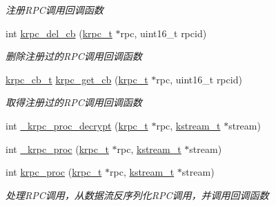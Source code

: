 \begin{DoxyCompactItemize}
\begin{DoxyCompactList}\small\item\em 注册\+R\+P\+C调用回调函数 \end{DoxyCompactList}\item 
int \hyperlink{a00086_a76529ccab5c6f0ada79cac791e299ef9_a76529ccab5c6f0ada79cac791e299ef9}{krpc\+\_\+del\+\_\+cb} (\hyperlink{a00051_a1e414ac6f6de24462ccf81e10f63428d_a1e414ac6f6de24462ccf81e10f63428d}{krpc\+\_\+t} $\ast$rpc, uint16\+\_\+t rpcid)
\begin{DoxyCompactList}\small\item\em 删除注册过的\+R\+P\+C调用回调函数 \end{DoxyCompactList}\item 
\hyperlink{a00051_a06bb708c1b97445d3a5d0c1b32ad2ab6_a06bb708c1b97445d3a5d0c1b32ad2ab6}{krpc\+\_\+cb\+\_\+t} \hyperlink{a00086_a7841a0b4c828efcb607a51bbdd9c9ab1_a7841a0b4c828efcb607a51bbdd9c9ab1}{krpc\+\_\+get\+\_\+cb} (\hyperlink{a00051_a1e414ac6f6de24462ccf81e10f63428d_a1e414ac6f6de24462ccf81e10f63428d}{krpc\+\_\+t} $\ast$rpc, uint16\+\_\+t rpcid)
\begin{DoxyCompactList}\small\item\em 取得注册过的\+R\+P\+C调用回调函数 \end{DoxyCompactList}\item 
int \hyperlink{a00086_a87f076f27729e0d352ffd12173ab13ab_a87f076f27729e0d352ffd12173ab13ab}{\+\_\+krpc\+\_\+proc\+\_\+decrypt} (\hyperlink{a00051_a1e414ac6f6de24462ccf81e10f63428d_a1e414ac6f6de24462ccf81e10f63428d}{krpc\+\_\+t} $\ast$rpc, \hyperlink{a00051_acc208c4c40c875eebbfef88f00fffacf_acc208c4c40c875eebbfef88f00fffacf}{kstream\+\_\+t} $\ast$stream)
\item 
int \hyperlink{a00086_ae905b4f6864964a0080435a81748c3f1_ae905b4f6864964a0080435a81748c3f1}{\+\_\+krpc\+\_\+proc} (\hyperlink{a00051_a1e414ac6f6de24462ccf81e10f63428d_a1e414ac6f6de24462ccf81e10f63428d}{krpc\+\_\+t} $\ast$rpc, \hyperlink{a00051_acc208c4c40c875eebbfef88f00fffacf_acc208c4c40c875eebbfef88f00fffacf}{kstream\+\_\+t} $\ast$stream)
\item 
int \hyperlink{a00086_ac583f7d7c3e3ecb9954530e8d0f6f5f1_ac583f7d7c3e3ecb9954530e8d0f6f5f1}{krpc\+\_\+proc} (\hyperlink{a00051_a1e414ac6f6de24462ccf81e10f63428d_a1e414ac6f6de24462ccf81e10f63428d}{krpc\+\_\+t} $\ast$rpc, \hyperlink{a00051_acc208c4c40c875eebbfef88f00fffacf_acc208c4c40c875eebbfef88f00fffacf}{kstream\+\_\+t} $\ast$stream)
\begin{DoxyCompactList}\small\item\em 处理\+R\+P\+C调用，从数据流反序列化\+R\+P\+C调用，并调用回调函数 \end{DoxyCompactList}\item 

\end{DoxyCompactItemize}
